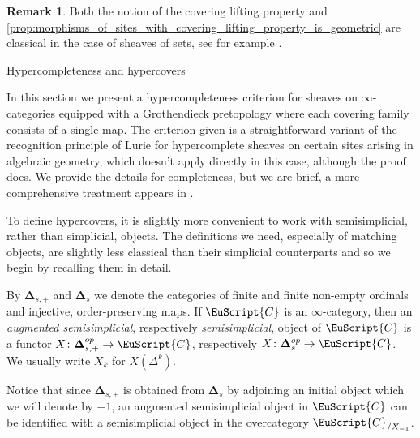 \documentclass[oneside,a4paper]{amsart}
\makeatletter
\newcommand{\euscr}[1]{\EuScript{#1}} %
\newcommand{\ccat}{\euscr{C}} %
\newcommand{\thickdelta}{\mathbf{\Delta}} %
\theoremstyle{plain}
\theoremstyle{definition}
\newtheorem{rem}[thm]{Remark}
\theoremstyle{remark}
\def\subsection{\@startsection{subsection}{1}%
  \z@{.7\linespacing\@plus\linespacing}{.5\linespacing}%
  {\normalfont\bfseries\centering}}%
\makeatother
\begin{document}
\begin{rem}
Both the notion of the covering lifting property and \cref{prop:morphisms_of_sites_with_covering_lifting_property_is_geometric} are classical in the case of sheaves of sets, see for example \cite[VII.10.5]{maclane2012sheaves}.
\end{rem}

\subsection{Hypercompleteness and hypercovers} 

In this section we present a hypercompleteness criterion for sheaves on $\infty$-categories equipped with a Grothendieck pretopology where each covering family consists of a single map. The criterion given is a straightforward variant of the recognition principle of Lurie for hypercomplete sheaves on certain sites arising in algebraic geometry, which doesn't apply directly in this case, although the proof does. We provide the details for completeness, but we are brief, a more comprehensive treatment appears in \cite[A.5]{lurie_spectral_algebraic_geometry} . 

To define hypercovers, it is slightly more convenient to work with semisimplicial, rather than simplicial, objects. The definitions we need, especially of matching objects, are slightly less classical than their simplicial counterparts and so we begin by recalling them in detail. 

By $\thickdelta_{s, +}$ and $\thickdelta_{s}$ we denote the categories of finite and finite non-empty ordinals and injective, order-preserving maps. If $\ccat$ is an $\infty$-category, then an \emph{augmented semisimplicial}, respectively \emph{semisimplicial}, object of $\ccat$ is a functor $X \colon \thickdelta_{s, +}^{op} \rightarrow \ccat$, respectively $X \colon \thickdelta_{s}^{op} \rightarrow \ccat$. We usually write $X_{k}$ for $X(\Delta^{k})$. 

Notice that since $\thickdelta_{s, +}$ is obtained from $\thickdelta_{s}$ by adjoining an initial object which we will denote by $-1$, an augmented semisimplicial object in $\ccat$ can be identified with a semisimplicial object in the overcategory $\ccat _{/ X_{-1}}$.
\end{document}
